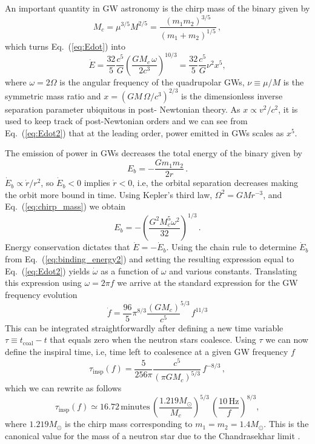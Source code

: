 \documentclass[prd,amsmath,amssymb,aps,floats,amsfonts,notitlepage,superscriptaddress,eqsecnum,nofootinbib,10pt]{revtex4-1}
\newcommand{\f}{\frac}
\newcommand{\be}{\begin{equation}}
\newcommand{\ee}{\end{equation}}
\begin{document}
An important quantity in GW astronomy is the chirp mass of the binary given by
%
\be
M_c = \mu^{3/5} M^{2/5} = \f{(m_1 m_2)^{3/5}}{(m_1+m_2)^{1/5}} \label{eq:chirp_mass}\, ,
\ee
%
which turns Eq.~(\ref{eq:Edot}) into
%
\be
\dot{E} = \f{32}{5}\f{c^5}{G} \left(\f{G M_c\, \omega}{2c^3}\right)^{10/3}= \f{32}{5}\f{c^5}{G} \nu^2 x^5, \label{eq:Edot2}
\ee
%
where $\omega=2\Omega$ is the angular frequency of the quadrupolar GWs, $\nu\equiv \mu/M$ is the symmetric mass ratio and $x = ({G M\, \Omega}/{c^3})^{2/3} $ is the dimensionless inverse separation parameter ubiquitous 
in post- Newtonian theory. 
As $x\propto v^2/c^2$, it is used to keep track of post-Newtonian orders and we can see from Eq.~(\ref{eq:Edot2}) that 
at the leading order, power emitted in GWs scales as $x^5$.

The emission of power in GWs decreases the total energy of the binary given by
%
\be
E_b = -\frac{G m_1 m_2}{2r}\,.  \label{eq:binding_energy1}
\ee
%
$\dot{E}_b \propto \dot{r}/r^2$, so $\dot{E}_b < 0$ implies $\dot{r}<0$, i.e, the orbital separation decreases
making the orbit more bound in time.
Using Kepler's third law, $ \Omega^2 = G M r^{-3}$, and Eq.~(\ref{eq:chirp_mass}) we obtain
%
\be
E_b = -\left(\f{G^2 M_c^5 \omega^2}{32}\right)^{1/3}\, . \label{eq:binding_energy2}
\ee
%
Energy conservation dictates that $\dot{E}=-\dot{E}_b$. Using the chain rule to determine $\dot{E}_b$ from Eq.~(\ref{eq:binding_energy2})
and setting the resulting expression equal to Eq.~(\ref{eq:Edot2}) yields $\dot{\omega}$ as a function of $\omega$ and various constants.
Translating this expression using $\omega=2\pi f$ we arrive at the standard expression for the GW frequency evolution
%
\be
\dot{f} = \f{96}{5}\pi^{8/3} \f{(G M_c)}{c^5}^{5/3}\, f^{11/3} \label{eq:fdot}
\ee
%
This can be integrated straightforwardly after defining a new time variable $\tau\equiv t_\text{coal}-t$ that equals zero when the neutron stars coalesce.
Using $\tau$ we can now define the inspiral time, i.e, time left to coalesence at a given GW frequency $f$
%
\be
\tau_\text{insp}(f) = \f{5}{256\pi}\f{c^5}{(\pi G M_c)^{5/3}} \,f^{-8/3}\label{eq:tau_insp}\, ,
\ee
%
%
%
which we can rewrite as follows
%
\be
\tau_\text{insp}(f) \simeq 16.72\,\text{minutes} \, \left(\f{1.219 M_\odot}{M_c}\right)^{5/3}\,\left(\f{10\,\text{Hz}}{f}\right)^{8/3}, \label{eq:tau_insp2}
\ee
%
where $1.219 M_\odot$ is the chirp mass corresponding to $m_1=m_2=1.4 M_\odot$. This is the canonical value for the 
mass of a neutron star due to the Chandrasekhar limit \cite{Chandra}.
\end{document}
